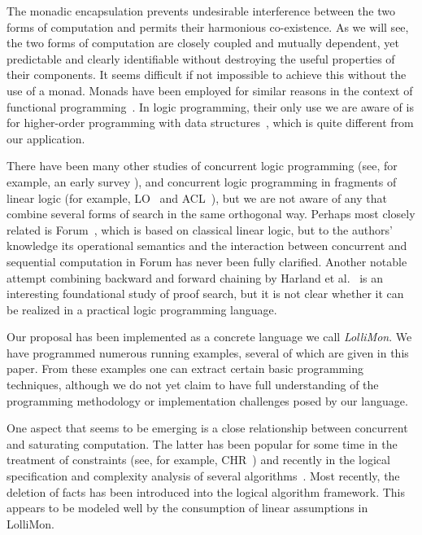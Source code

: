 \documentclass{sig-alt}
\begin{document}
The monadic encapsulation prevents undesirable interference between
the two forms of computation and permits their harmonious
co-existence.  As we will see, the two forms of computation are
closely coupled and mutually dependent, yet predictable and clear\-ly
identifiable without destroying the useful properties of their
components.  It seems difficult if not impossible to achieve this
without the use of a monad.  Monads have been employed for similar
reasons in the context of functional programming~\cite{Wadler92popl}.
In logic programming, their only use we are aware of is for
higher-order programming with data structures~\cite{Bekkers95ilps,McGrail97},
which is quite different from our application.

There have been many other studies of concurrent logic programming (see,
for example, an early survey \cite{Shapiro89}), and concurrent logic
programming in fragments of linear logic (for example, LO~\cite{Andreoli90oopsla} and
ACL~\cite{Kobayashi94tr}), but we are not aware of
any that combine several forms of search in the same orthogonal way.
Perhaps most closely related is Forum~\cite{Miller96tcs}, which is based on
classical linear logic, but to the authors' knowledge its operational
semantics and the interaction between concurrent and sequential
computation in Forum has never been fully clarified.  Another notable
attempt combining backward and forward chaining by Harland et
al.\ \cite{Harland00pstt} is an interesting foundational study of proof
search, but it is not clear whether it can be realized in a practical
logic programming language.

Our proposal has been implemented as a concrete language we call
\emph{LolliMon}.  We have programmed numerous running examples,
several of which are given in this paper.  From these examples one can
extract certain basic programming techniques, although we do not yet
claim to have full understanding of the programming methodology or
implementation challenges posed by our language.

One aspect that seems to be emerging is a close relationship between
concurrent and saturating computation.  The latter has been popular
for some time in the treatment of constraints (see, for example,
CHR~\cite{Fruehwirth98jlp}) and recently in the logical specification
and complexity analysis of several
algorithms~\cite{Ganzinger01ijcar,Mcallester02jacm}.  Most recently,
the deletion of facts has been introduced into the logical algorithm
framework. This appears to be modeled well by the consumption of
linear assumptions in LolliMon.
\end{document}
